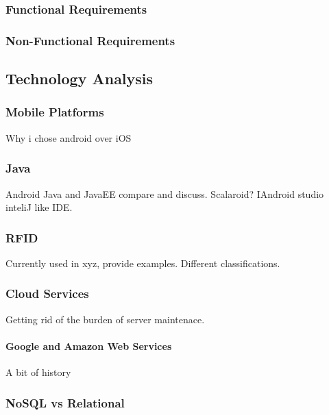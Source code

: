 \documentclass[a4paper, 11pt]{article}
\begin{document}
\subsubsection{Functional Requirements}
\subsubsection{Non-Functional Requirements}


\subsection{Technology Analysis}
\subsubsection{Mobile Platforms}
Why i chose android over iOS
\subsubsection{Java}
Android Java and JavaEE compare and discuss. Scalaroid? IAndroid studio inteliJ like IDE.
\subsubsection{RFID}
Currently used in xyz, provide examples. Different classifications. 
\subsubsection{Cloud Services} 
Getting rid of the burden of server maintenace. 
\paragraph{Google and Amazon Web Services}
A bit of history


\subsubsection{NoSQL vs Relational}
\end{document}
